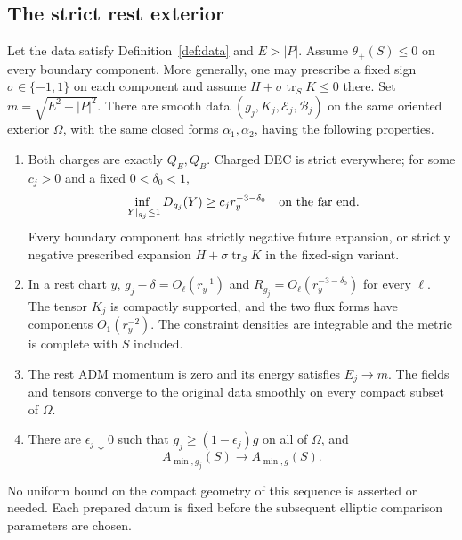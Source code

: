 \subsection{The strict rest exterior}

\begin{proposition}\label{en:rest-preparation}
Let the data satisfy Definition~\ref{def:data} and $E>|P|$.
Assume $\theta_+(S)\leq0$ on every boundary component. More generally,
one may prescribe a fixed sign $\sigma\in\{-1,1\}$ on each component
and assume $H+\sigma\operatorname{tr}_S K\leq0$ there.
Set $m=\sqrt{E^2-|P|^2}$. There are smooth data
$(g_j,K_j,\mathcal E_j,\mathcal B_j)$ on the same oriented exterior
$\Omega$, with the same closed forms $\alpha_1,\alpha_2$, having
the following properties.
\begin{enumerate}
 \item Both charges are exactly $Q_E,Q_B$. Charged DEC is strict
 everywhere; for some $c_j>0$ and a fixed $0<\delta_0<1$,
 \[
  \inf_{|Y|_{g_j}\leq1}D_{g_j}(Y)
       \geq c_j r_y^{-3-\delta_0}
       \quad\hbox{on the far end}.
 \]
 Every boundary component has strictly negative future expansion,
 or strictly negative prescribed expansion
 $H+\sigma\operatorname{tr}_S K$ in the fixed-sign variant.
 \item In a rest chart $y$, $g_j-\delta=O_\ell(r_y^{-1})$ and
 $R_{g_j}=O_\ell(r_y^{-3-\delta_0})$ for every $\ell$.
 The tensor $K_j$ is compactly supported, and the two flux forms
 have components $O_1(r_y^{-2})$. The constraint densities are
 integrable and the metric is complete with $S$ included.
 \item The rest ADM momentum is zero and its energy satisfies
 $E_j\to m$. The fields and tensors converge to the original data
 smoothly on every compact subset of $\Omega$.
 \item There are $\epsilon_j\downarrow0$ such that
 $g_j\geq(1-\epsilon_j)g$ on all of $\Omega$, and
 \begin{equation}\label{en:area-convergence}
  A_{\min,g_j}(S)\longrightarrow A_{\min,g}(S).
 \end{equation}
\end{enumerate}
No uniform bound on the compact geometry of this sequence is asserted
or needed. Each prepared datum is fixed before the subsequent
elliptic comparison parameters are chosen.
\end{proposition}

